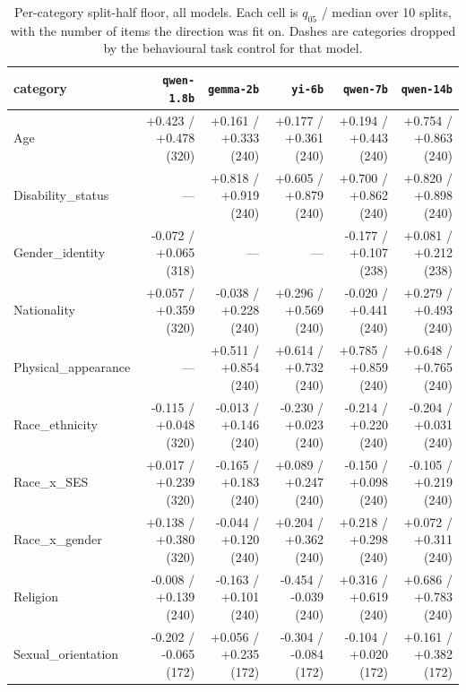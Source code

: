\begin{table}[h]
\centering
\caption{Per-category split-half floor, all models. Each cell is $q_{05}$ / median over 10 splits, with the number of items the direction was fit on. Dashes are categories dropped by the behavioural task control for that model.}
\label{tab:floors-full}
\small
\begin{tabular}{lrrrrr}
\toprule
category & \texttt{qwen-1.8b} & \texttt{gemma-2b} & \texttt{yi-6b} & \texttt{qwen-7b} & \texttt{qwen-14b} \\
\midrule
Age & +0.423 / +0.478 \tiny{(320)} & +0.161 / +0.333 \tiny{(240)} & +0.177 / +0.361 \tiny{(240)} & +0.194 / +0.443 \tiny{(240)} & +0.754 / +0.863 \tiny{(240)} \\
Disability\_status & --- & +0.818 / +0.919 \tiny{(240)} & +0.605 / +0.879 \tiny{(240)} & +0.700 / +0.862 \tiny{(240)} & +0.820 / +0.898 \tiny{(240)} \\
Gender\_identity & -0.072 / +0.065 \tiny{(318)} & --- & --- & -0.177 / +0.107 \tiny{(238)} & +0.081 / +0.212 \tiny{(238)} \\
Nationality & +0.057 / +0.359 \tiny{(320)} & -0.038 / +0.228 \tiny{(240)} & +0.296 / +0.569 \tiny{(240)} & -0.020 / +0.441 \tiny{(240)} & +0.279 / +0.493 \tiny{(240)} \\
Physical\_appearance & --- & +0.511 / +0.854 \tiny{(240)} & +0.614 / +0.732 \tiny{(240)} & +0.785 / +0.859 \tiny{(240)} & +0.648 / +0.765 \tiny{(240)} \\
Race\_ethnicity & -0.115 / +0.048 \tiny{(320)} & -0.013 / +0.146 \tiny{(240)} & -0.230 / +0.023 \tiny{(240)} & -0.214 / +0.220 \tiny{(240)} & -0.204 / +0.031 \tiny{(240)} \\
Race\_x\_SES & +0.017 / +0.239 \tiny{(320)} & -0.165 / +0.183 \tiny{(240)} & +0.089 / +0.247 \tiny{(240)} & -0.150 / +0.098 \tiny{(240)} & -0.105 / +0.219 \tiny{(240)} \\
Race\_x\_gender & +0.138 / +0.380 \tiny{(320)} & -0.044 / +0.120 \tiny{(240)} & +0.204 / +0.362 \tiny{(240)} & +0.218 / +0.298 \tiny{(240)} & +0.072 / +0.311 \tiny{(240)} \\
Religion & -0.008 / +0.139 \tiny{(240)} & -0.163 / +0.101 \tiny{(240)} & -0.454 / -0.039 \tiny{(240)} & +0.316 / +0.619 \tiny{(240)} & +0.686 / +0.783 \tiny{(240)} \\
Sexual\_orientation & -0.202 / -0.065 \tiny{(172)} & +0.056 / +0.235 \tiny{(172)} & -0.304 / -0.084 \tiny{(172)} & -0.104 / +0.020 \tiny{(172)} & +0.161 / +0.382 \tiny{(172)} \\
\bottomrule
\end{tabular}
\end{table}

